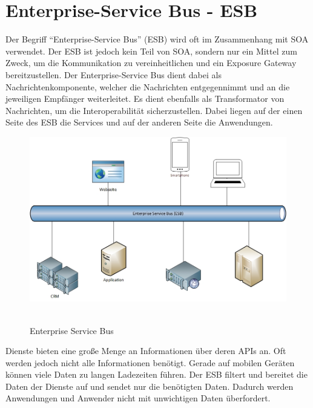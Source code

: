 \section{Enterprise-Service Bus - ESB}
\label{sec:esb}
Der Begriff "`Enterprise-Service Bus"' (ESB) wird oft im Zusammenhang mit SOA verwendet. Der ESB ist jedoch kein Teil von SOA, sondern nur ein Mittel zum Zweck, um die Kommunikation zu vereinheitlichen und ein Exposure Gateway bereitzustellen. Der Enterprise-Service Bus dient dabei als Nachrichtenkomponente, welcher die Nachrichten entgegennimmt und an die jeweiligen Empfänger weiterleitet. Es dient ebenfalls als Transformator von Nachrichten, um die Interoperabilität sicherzustellen. Dabei liegen auf der einen Seite des ESB die Services und auf der anderen Seite die Anwendungen.

\begin{figure}[htb]
    \centering 
    \includegraphics[width=\linewidth]{content/images/ESB}\
    \caption[ESB]{Enterprise Service Bus}
    \label{fig:esb}  
\end{figure}
\newpage
Dienste bieten eine große Menge an Informationen über deren APIs an. Oft werden jedoch nicht alle Informationen benötigt. Gerade auf mobilen Geräten können viele Daten zu langen Ladezeiten führen. Der ESB filtert und bereitet die Daten der Dienste auf und sendet nur die benötigten Daten. Dadurch werden Anwendungen und Anwender nicht mit unwichtigen Daten überfordert.